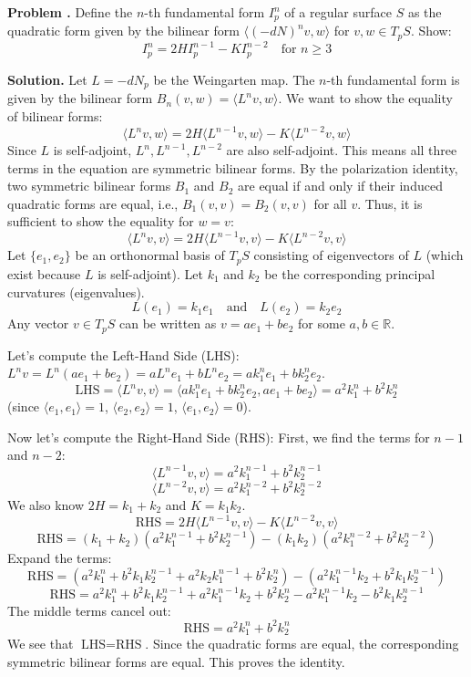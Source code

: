 \documentclass[12pt, a4paper, oneside]{article}
\newcounter{problemname}
\newenvironment{problem}
  {\begin{shaded}\stepcounter{problemname}\par\noindent\textbf{Problem \arabic{problemname}.
  }\newline}
  {\end{shaded}\par}
\newenvironment{solution}
  {\par\noindent\textbf{Solution. }\newline}
  {\par}
\begin{document}
\newpage

\begin{problem}
Define the $n$-th fundamental form $I_{p}^{n}$ of a regular surface $S$ as the quadratic
form given by the bilinear form $\langle(-dN)^{n}v,w\rangle$ for $v, w\in T_{p}S$. Show:
\[ I_{p}^{n}=2HI_{p}^{n-1}-KI_{p}^{n-2} \quad \text{for } n\ge3 \text{} \]
\end{problem}

\begin{solution}
Let $L = -dN_p$ be the Weingarten map. The $n$-th fundamental form is given by the bilinear form $B_n(v,w) = \langle L^n v, w \rangle$.
We want to show the equality of bilinear forms:
\[ \langle L^n v, w \rangle = 2H \langle L^{n-1} v, w \rangle - K \langle L^{n-2} v, w \rangle \]
Since $L$ is self-adjoint, $L^n, L^{n-1}, L^{n-2}$ are also self-adjoint. This means all three terms in the equation are symmetric bilinear forms.
By the polarization identity, two symmetric bilinear forms $B_1$ and $B_2$ are equal if and only if their induced quadratic forms are equal, i.e., $B_1(v,v) = B_2(v,v)$ for all $v$.
Thus, it is sufficient to show the equality for $w=v$:
\[ \langle L^n v, v \rangle = 2H \langle L^{n-1} v, v \rangle - K \langle L^{n-2} v, v \rangle \]
Let $\{e_1, e_2\}$ be an orthonormal basis of $T_pS$ consisting of eigenvectors of $L$ (which exist because $L$ is self-adjoint). Let $k_1$ and $k_2$ be the corresponding principal curvatures (eigenvalues).
\[ L(e_1) = k_1 e_1 \quad \text{and} \quad L(e_2) = k_2 e_2 \]
Any vector $v \in T_pS$ can be written as $v = a e_1 + b e_2$ for some $a, b \in \mathbb{R}$.

Let's compute the Left-Hand Side (LHS):
$L^n v = L^n(a e_1 + b e_2) = a L^n e_1 + b L^n e_2 = a k_1^n e_1 + b k_2^n e_2$.
\[ \text{LHS} = \langle L^n v, v \rangle = \langle a k_1^n e_1 + b k_2^n e_2, a e_1 + b e_2 \rangle = a^2 k_1^n + b^2 k_2^n \]
(since $\langle e_1, e_1 \rangle = 1$, $\langle e_2, e_2 \rangle = 1$, $\langle e_1, e_2 \rangle = 0$).

Now let's compute the Right-Hand Side (RHS):
First, we find the terms for $n-1$ and $n-2$:
\[ \langle L^{n-1} v, v \rangle = a^2 k_1^{n-1} + b^2 k_2^{n-1} \]
\[ \langle L^{n-2} v, v \rangle = a^2 k_1^{n-2} + b^2 k_2^{n-2} \]
We also know $2H = k_1 + k_2$ and $K = k_1 k_2$.
\[ \text{RHS} = 2H \langle L^{n-1} v, v \rangle - K \langle L^{n-2} v, v \rangle \]
\[ \text{RHS} = (k_1 + k_2)(a^2 k_1^{n-1} + b^2 k_2^{n-1}) - (k_1 k_2)(a^2 k_1^{n-2} + b^2 k_2^{n-2}) \]
Expand the terms:
\[ \text{RHS} = (a^2 k_1^n + b^2 k_1 k_2^{n-1} + a^2 k_2 k_1^{n-1} + b^2 k_2^n) - (a^2 k_1^{n-1} k_2 + b^2 k_1 k_2^{n-1}) \]
\[ \text{RHS} = a^2 k_1^n + b^2 k_1 k_2^{n-1} + a^2 k_1^{n-1} k_2 + b^2 k_2^n - a^2 k_1^{n-1} k_2 - b^2 k_1 k_2^{n-1} \]
The middle terms cancel out:
\[ \text{RHS} = a^2 k_1^n + b^2 k_2^n \]
We see that $\text{LHS} = \text{RHS}$.
Since the quadratic forms are equal, the corresponding symmetric bilinear forms are equal. This proves the identity.
\end{solution}
\end{document}
